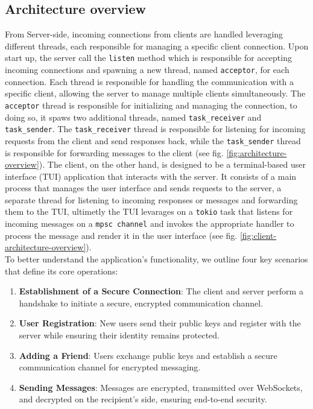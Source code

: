\subsection{Architecture overview}
\label{subsec:ArchitectureOverview}
From Server-side, incoming connections from clients are handled leveraging different threads, each responsible for managing a specific client connection.
Upon start up, the server call the \texttt{listen} method which is responsible for accepting incoming connections and spawning a new thread, named \texttt{acceptor}, for each connection. Each thread is responsible for handling the communication with a specific client, allowing the server to manage multiple clients simultaneously. The \texttt{acceptor} thread is responsible for initializing and managing the connection, to doing so, it spaws two additional threads, named \texttt{task\_receiver} and \texttt{task\_sender}. The \texttt{task\_receiver} thread is responsible for listening for incoming requests from the client and send responses back, while the \texttt{task\_sender} thread is responsible for forwarding messages to the client (see fig. \ref{fig:architecture-overview}).
The client, on the other hand, is designed to be a terminal-based user interface (TUI) application that interacts with the server. It consists of a main process that manages the user interface and sends requests to the server, a separate thread for listening to incoming responses or messages and forwarding them to the TUI, ultimetly the TUI levarages on a \texttt{tokio} task that listens for incoming messages on a \texttt{mpsc channel} and invokes the appropriate handler to process the message and render it in the user interface (see fig. \ref{fig:client-architecture-overview}).\\

To better understand the application's functionality, we outline four key scenarios that define its core operations:

\begin{enumerate}
    \item \textbf{Establishment of a Secure Connection}: The client and server perform a handshake to initiate a secure, encrypted communication channel.
    \item \textbf{User Registration}: New users send their public keys and register with the server while ensuring their identity remains protected.
    \item \textbf{Adding a Friend}: Users exchange public keys and establish a secure communication channel for encrypted messaging.
    \item \textbf{Sending Messages}: Messages are encrypted, transmitted over WebSockets, and decrypted on the recipient’s side, ensuring end-to-end security.
\end{enumerate}


